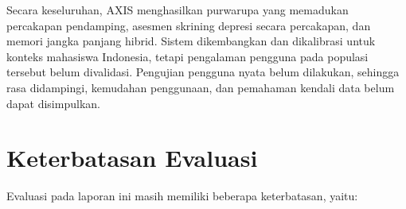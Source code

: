 \begin{enumerate}[label=\arabic*.,leftmargin=*,itemsep=4pt]
\end{enumerate}

Secara keseluruhan, AXIS menghasilkan purwarupa yang memadukan percakapan
pendamping, asesmen skrining depresi secara percakapan, dan memori jangka
panjang hibrid. Sistem dikembangkan dan dikalibrasi untuk konteks mahasiswa
Indonesia, tetapi pengalaman pengguna pada populasi tersebut belum divalidasi.
Pengujian pengguna nyata belum dilakukan, sehingga rasa didampingi, kemudahan
penggunaan, dan pemahaman kendali data belum dapat disimpulkan.

\section{Keterbatasan Evaluasi}
\label{sec:keterbatasan}

Evaluasi pada laporan ini masih memiliki beberapa keterbatasan, yaitu:
